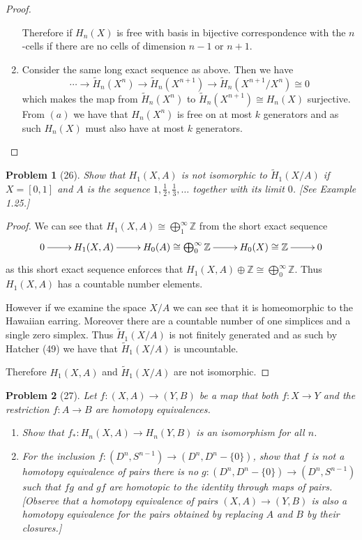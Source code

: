 \documentclass[10pt]{article}
\newcommand{\sk}{\vskip 10mm}
\newcommand{\bb}[1]{\mathbb{#1}}
\newcommand{\wt}[1]{\widetilde{#1}}
\theoremstyle{plain}
\newtheorem{problem}{Problem}
\theoremstyle{remark}
\begin{document}
\begin{proof}
\begin{enumerate}
    Therefore if $H_n(X)$ is free with basis in bijective correspondence
    with the $n$-cells if there are no cells of dimension $n-1$ or $n+1$.
  \item[(c)]
    Consider the same long exact sequence as above. Then we have
    \[
      \cdots \rightarrow \wt{H}_n(X^n)\rightarrow\wt{H}_n(X^{n+1})\rightarrow\wt{H}_n(X^{n+1}/X^n)\cong 0
    \]
    which makes the map from $\wt{H}_n(X^n)$ to $\wt{H}_n(X^{n+1})\cong H_n(X)$
    surjective. From $(a)$ we have that $H_n(X^n)$ is free on at most
    $k$ generators and as such $H_n(X)$ must also have at most $k$
    generators.
  \end{enumerate}
\end{proof}

\sk

\begin{problem}[26]
  Show that $H_1(X,A)$ is not isomorphic to $\wt{H}_1(X/A)$ if
  $X=[0,1]$ and $A$ is the sequence $1,\frac{1}{2},\frac{1}{3},\ldots$
  together with its limit $0$. [See Example 1.25.]
\end{problem}

\begin{proof}
  We can see that $H_1(X,A)\cong\bigoplus_1^\infty\bb{Z}$ from the short exact sequence
  \[
    \xymatrix{
      0\ar[r] & H_1(X,A) \ar[r] & H_0(A)\cong \bigoplus_0^\infty\bb{Z} \ar[r] & H_0(X)\cong \bb{Z} \ar[r] & 0
    }
  \]
  as this short exact sequence enforces that $H_1(X,A)\oplus \bb{Z}\cong \bigoplus_0^\infty\bb{Z}$. Thus
  $H_1(X,A)$ has a countable number elements.

  However if we examine the space $X/A$ we can see that it is homeomorphic to the
  Hawaiian earring. Moreover there are a countable number of one simplices and
  a single zero simplex. Thus $\wt{H}_1(X/A)$ is not finitely generated
  and as such by Hatcher (49) we have that $\wt{H}_1(X/A)$ is uncountable.

  Therefore $H_1(X,A)$ and $\wt{H}_1(X/A)$ are not isomorphic.
\end{proof}

\sk

\begin{problem}[27]
  Let $f:(X,A)\rightarrow(Y,B)$ be a map that both $f:X\rightarrow Y$ and the restriction
  $f:A\rightarrow B$ are homotopy equivalences.
  \begin{enumerate}
  \item[(a)] Show that $f_*:H_n(X,A)\rightarrow H_n(Y,B)$ is an
    isomorphism for all $n$.
  \item[(b)] For the inclusion $f:(D^n,S^{n-1})\rightarrow(D^n,D^n-\{0\})$, show
    that $f$ is not a homotopy equivalence of pairs \textemdash there
    is no $g:(D^n,D^n-\{0\})\rightarrow(D^n,S^{n-1})$ such that $fg$
    and $gf$ are homotopic to the identity through maps of pairs.
    [Observe that a homotopy equivalence of pairs $(X,A)\rightarrow(Y,B)$
    is also a homotopy equivalence for the pairs obtained by
    replacing $A$ and $B$ by their closures.]
  \end{enumerate}
\end{problem}
\end{document}
